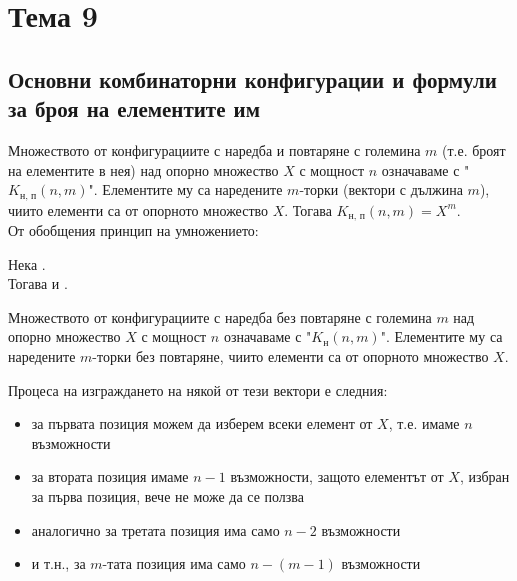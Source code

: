\section{Тема 9}

\subsection{Основни комбинаторни конфигурации и формули за броя на елементите им} 

\begin{definition}
    Множеството от конфигурациите с наредба и повтаряне с големина \(m\) (т.е. броят на елементите в нея) 
    над опорно множество \(X\) с мощност \(n\) означаваме с "\(K_\text{н, п}(n, m)\)". Елементите му са 
    наредените \(m\)-торки (вектори с дължина \(m\)), чиито елементи са от опорното множество \(X\). 
    Тогава \(K_\text{н, п}(n, m) = X^m\). \\
    От обобщения принцип на умножението: 
\end{definition}

\begin{example}
    Нека . \\
    Тогава  и .
\end{example}

\begin{definition}
    Множеството от конфигурациите с наредба без повтаряне с големина \(m\) 
    над опорно множество \(X\) с мощност \(n\) означаваме с "\(K_\text{н}(n, m)\)". Елементите му са 
    наредените \(m\)-торки без повтаряне, чиито елементи са от опорното множество \(X\).
\end{definition}

Процеса на изграждането на някой от тези вектори е следния: 
\begin{itemize}
    \item за първата позиция можем да изберем всеки елемент от \(X\), т.е. имаме \(n\) възможности
    \item за втората позиция имаме \(n - 1\) възможности, защото елементът от \(X\), избран за първа позиция,
    вече не може да се ползва
    \item аналогично за третата позиция има само \(n - 2\) възможности
    \item и т.н., за \(m\)-тата позиция има само \(n - (m - 1)\) възможности
\end{itemize}

